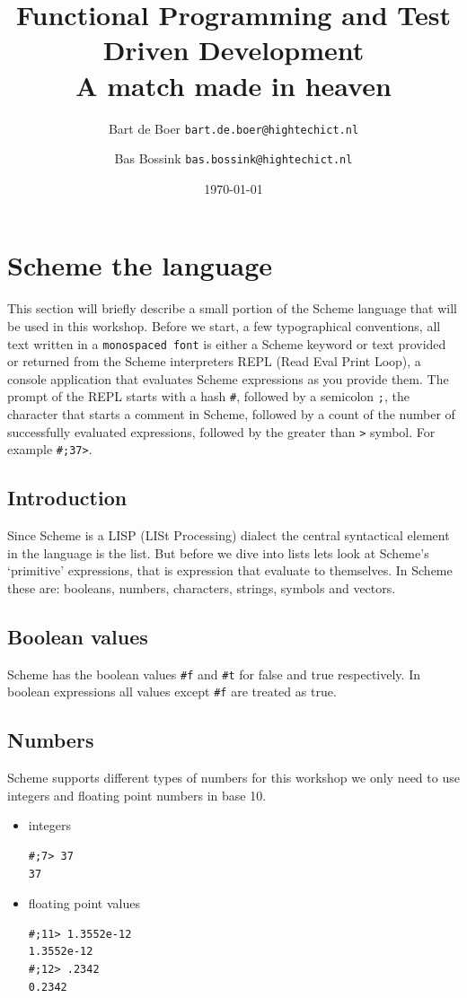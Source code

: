 \documentclass[12pt,a4paper,english,twoside]{article}
\author{
    Bart de Boer \texttt{bart.de.boer@hightechict.nl}
    \and
    Bas Bossink \texttt{bas.bossink@hightechict.nl}
}
\date{\today}
\title{Functional Programming and Test Driven Development\\
\vspace{2 mm} {\large A match made in heaven}}
\begin{document}
\maketitle
\section{Scheme the language}
This section will briefly describe a small portion of the Scheme language that 
will be used in this workshop.
Before we start, a few typographical conventions, all text written in a 
\texttt{monospaced font} is either a Scheme keyword or text provided or 
returned from the Scheme interpreters REPL (Read Eval Print Loop), a console 
application that evaluates Scheme expressions as you provide them. The prompt 
of the REPL starts with a hash \texttt{\#}, followed by a semicolon \texttt{;}, the 
character that starts a comment in Scheme, followed by a count of the number 
of successfully evaluated expressions, followed by the greater than \texttt{>} 
symbol. For example \texttt{\#;37>}.
\subsection{Introduction}
Since Scheme is a LISP (LISt Processing) dialect the central syntactical 
element in the language is the list. But before we dive into lists lets look 
at Scheme's `primitive' expressions, that is expression that evaluate to 
themselves. In Scheme these are: booleans, numbers, characters, strings, 
symbols and vectors.
\subsection{Boolean values}
Scheme has the boolean values \texttt{\#f} and \texttt{\#t} for false and true 
respectively. In boolean expressions all values except \texttt{\#f} are 
treated as true.
\subsection{Numbers}
Scheme supports different types of numbers for this workshop we only need to 
use integers and floating point numbers in base 10.
\begin{itemize}
\item integers 
\begin{lstlisting}
#;7> 37
37
\end{lstlisting}
\item floating point values
\begin{lstlisting}
#;11> 1.3552e-12
1.3552e-12 
#;12> .2342
0.2342
\end{lstlisting}
\end{itemize}
\end{document}
